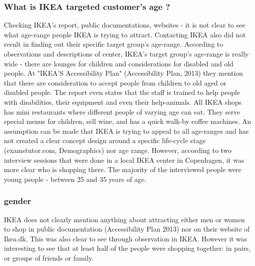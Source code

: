 \subsubsection{What is IKEA targeted customer's age ?}
Checking IKEA's report, public documentations, websites -  it is not clear to see what age-range people IKEA is trying to attract. Contacting IKEA also did not result in finding out their specific target group's age-range. According to observations and descriptions of center, IKEA's target group's age-range is really wide - there are lounges for children and considerations for disabled and old people. At "IKEA'S Accessibility Plan" (Accessibility Plan, 2013) they mention that there are consideration to accept people from children to old aged or disabled people. The report even states that the staff is trained to help people with disabilities, their equipment and even their help-animals. All IKEA shops has mini restaurants where different people of varying age can eat. They serve special menus for children, sell wine, and has a quick walk-by coffee machines. An assumption can be made that IKEA is trying to appeal to all age-ranges and has not created a clear concept design around a specific life-cycle stage (examstutor.com, Demographics) nor age range. 
However, according to two interview sessions that were done in a local IKEA center in Copenhagen, it was more clear who is shopping there. The majority of the interviewed people were young people - between 25 and 35 years of age.

\subsubsection{gender}
IKEA does not clearly mention anything about attracting either men or women to shop in public documentation (Accessibility Plan 2013) nor on their website of Ikea.dk. This was also clear to see through observation in IKEA. However it was interesting to see that at least half of the people were shopping together: in pairs, or groups of friends or family. 
